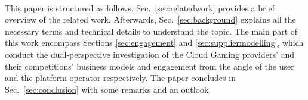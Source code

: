 ~\\
This paper is structured as follows. Sec.~\ref{sec:relatedwork} provides a brief overview of the related work. Afterwards, Sec.~\ref{sec:background} explains all the necessary terms and technical details to understand the topic. The main part of this work encompass Sections \ref{sec:engagement} and \ref{sec:suppliermodelling}, which conduct the dual-perspective investigation of the Cloud Gaming providers' and their competitions' business models and engagement from the angle of the user and the platform operator respectively. The paper concludes in Sec.~\ref{sec:conclusion} with some remarks and an outlook.


